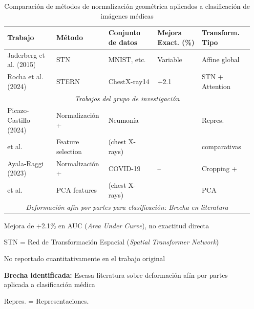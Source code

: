 
\begin{table}[htbp]
\centering
\begin{threeparttable}
\caption{Comparación de métodos de normalización geométrica aplicados a clasificación de imágenes médicas}
\label{tab:geometric_normalization_comparison}
\small
\setlength{\tabcolsep}{2pt}
\begin{tabular}{@{}p{3.2cm}p{2.6cm}p{2.4cm}p{1.5cm}p{2.2cm}@{}}
\toprule
\textbf{Trabajo} & \textbf{Método} & \textbf{Conjunto de datos} & \textbf{Mejora Exact. (\%)} & \textbf{Transform. Tipo} \\
\midrule
Jaderberg et al. (2015) \cite{jaderberg2015spatial} & STN & MNIST, etc. & Variable & Affine global \\
Rocha et al. (2024) \cite{rocha2024stern} & STERN & ChestX-ray14 & +2.1\tnote{a} & STN + Attention \\
\midrule
\multicolumn{5}{c}{\textit{Trabajos del grupo de investigación}} \\
\midrule
Picazo-Castillo (2024) \cite{picazo2024comparative} & Normalización + & Neumonía & -- & Repres. \\
 et al. & Feature selection & (chest X-rays) & & comparativas \\
Ayala-Raggi (2023) \cite{ayala2023synergizing} & Normalización + & COVID-19 & -- & Cropping + \\
 et al. & PCA features & (chest X-rays) & & PCA \\
\midrule
\multicolumn{5}{c}{\textit{Deformación afín por partes para clasificación: Brecha en literatura}} \\
\midrule
\bottomrule
\end{tabular}
\begin{tablenotes}
\footnotesize
\item[a] Mejora de +2.1\% en AUC (\textit{Area Under Curve}), no exactitud directa
\item STN = Red de Transformación Espacial (\textit{Spatial Transformer Network})
\item[--] No reportado cuantitativamente en el trabajo original
\item \textbf{Brecha identificada:} Escasa literatura sobre deformación afín por partes aplicada a clasificación médica
\item Repres. = Representaciones.
\end{tablenotes}
\end{threeparttable}
\end{table}
